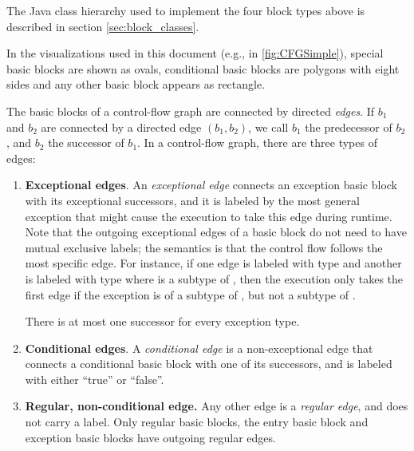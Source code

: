 The Java class hierarchy used to implement the four block types above is described in section \autoref{sec:block_classes}.

In the visualizations used in this document (e.g., in \autoref{fig:CFGSimple}), special basic blocks are
shown as ovals, conditional basic blocks are polygons with eight sides and any
other basic block appears as rectangle.

\begin{definition}
\label{def:edges}
The basic blocks of a control-flow graph are connected by directed \emph{edges}.
If $b_1$ and $b_2$ are connected by a directed edge $(b_1,b_2)$, we call
$b_1$ the predecessor of $b_2$, and $b_2$ the successor of $b_1$.
In a control-flow graph, there are three types of edges:
\begin{enumerate}
    \item \textbf{Exceptional edges}. An \emph{exceptional edge} connects an exception basic block
    with its exceptional successors, and it is labeled by the most
    general exception that might cause the execution to take this edge during runtime.
    Note that the outgoing exceptional edges of a basic block do not need to have mutual
    exclusive labels; the semantics is that the control flow follows the most specific
    edge. For instance, if one edge is labeled with type  and another is labeled
    with type  where  is a subtype of , then the execution only takes
    the first edge if the exception is of a subtype of , but not a subtype of .
    
    There is at most one successor for every exception type.
    \item \textbf{Conditional edges}. A \emph{conditional edge} is a non-exceptional
    edge that connects a conditional
    basic block with one of its successors, and is labeled with either ``true'' or
    ``false''.
    \item \textbf{Regular, non-conditional edge.} Any other edge is a \emph{regular edge}, and does not carry
    a label. Only regular basic blocks, the entry basic block and exception basic blocks have outgoing
    regular edges.
\end{enumerate}
\end{definition}


